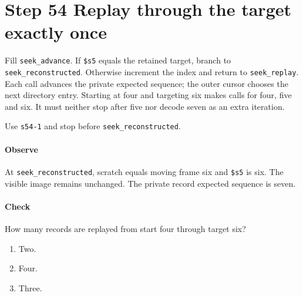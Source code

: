 \section{Step 54 Replay through the target exactly once}
Fill \texttt{seek\_advance}. If \texttt{\$s5} equals the retained target, branch to \texttt{seek\_reconstructed}. Otherwise increment the index and return to \texttt{seek\_replay}. Each call advances the private expected sequence; the outer cursor chooses the next directory entry. Starting at four and targeting six makes calls for four, five and six. It must neither stop after five nor decode seven as an extra iteration.

Use \texttt{s54-1} and stop before \texttt{seek\_reconstructed}.

\paragraph{Observe} At \texttt{seek\_reconstructed}, scratch equals moving frame six and \texttt{\$s5} is six. The visible image remains unchanged. The private record expected sequence is seven.

\paragraph{Check} How many records are replayed from start four through target six?
\begin{enumerate}[label=\Alph*.]
\item Two.
\item Four.
\item Three.
\end{enumerate}
